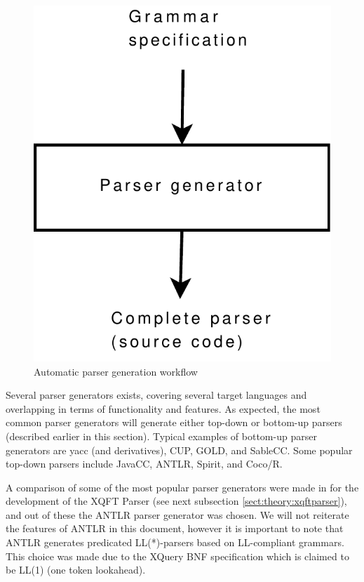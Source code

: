 \begin{figure}[h]
  \centering
    \includegraphics[scale=0.40]{diagrams/parser_generator}
  \caption{Automatic parser generation workflow}
  \label{figure:parser:generator}
\end{figure}

Several parser generators exists, covering several target languages and
overlapping in terms of functionality and features. As expected, the most
common parser generators will generate either top-down or bottom-up parsers
(described earlier in this section). Typical examples of bottom-up parser
generators are yacc (and derivatives), CUP, GOLD, and SableCC. Some popular
top-down parsers include JavaCC, ANTLR, Spirit, and Coco/R.

A comparison of some of the most popular parser generators were made in
\cite{ourselves} for the development of the XQFT Parser (see next subsection 
\ref{sect:theory:xqftparser}), and out of these the ANTLR parser generator was
chosen. We will not reiterate the features of ANTLR in this document, however
it is important to note that ANTLR generates predicated LL(*)-parsers based on
LL-compliant grammars. This choice was made due to the XQuery BNF specification
which is claimed to be LL(1) (one token lookahead).


